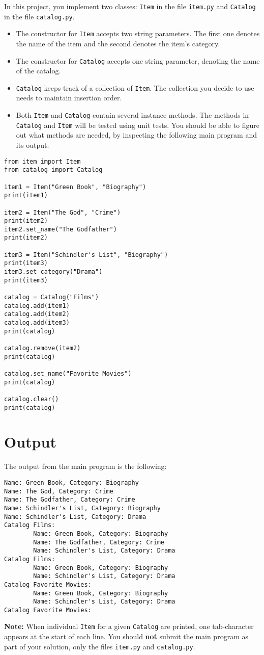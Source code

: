 
In this project, you implement two classes: 
\texttt{Item} in the file \texttt{item.py} and \texttt{Catalog} in the file \texttt{catalog.py}.  
\begin{itemize}
    \item The constructor for \texttt{Item} accepts two string parameters. The first one denotes the name of the item and the second denotes the item's category.
    \item The constructor for \texttt{Catalog} accepts one string parameter, denoting the name of the catalog.
    \item \texttt{Catalog} keeps track of a collection of \texttt{Item}. The collection you decide to use needs to maintain insertion order.
    \item Both \texttt{Item} and \texttt{Catalog} contain several instance methods. 
    The methods in \texttt{Catalog} and \texttt{Item} will be tested using unit tests. 
    You should be able to figure out what methods are needed, by inspecting the following main program and its output:
\end{itemize}

\begin{verbatim}
from item import Item
from catalog import Catalog

item1 = Item("Green Book", "Biography")
print(item1)

item2 = Item("The God", "Crime")
print(item2)
item2.set_name("The Godfather")
print(item2)

item3 = Item("Schindler's List", "Biography")
print(item3)
item3.set_category("Drama")
print(item3)

catalog = Catalog("Films")
catalog.add(item1)
catalog.add(item2)
catalog.add(item3)
print(catalog)

catalog.remove(item2)
print(catalog)

catalog.set_name("Favorite Movies")
print(catalog)

catalog.clear()
print(catalog)
\end{verbatim}

\section*{Output}
The output from the main program is the following: 
\begin{verbatim}
Name: Green Book, Category: Biography
Name: The God, Category: Crime
Name: The Godfather, Category: Crime
Name: Schindler's List, Category: Biography
Name: Schindler's List, Category: Drama
Catalog Films:
        Name: Green Book, Category: Biography
        Name: The Godfather, Category: Crime
        Name: Schindler's List, Category: Drama
Catalog Films:
        Name: Green Book, Category: Biography
        Name: Schindler's List, Category: Drama
Catalog Favorite Movies:
        Name: Green Book, Category: Biography
        Name: Schindler's List, Category: Drama
Catalog Favorite Movies:
\end{verbatim}

\textbf{Note:} When individual \texttt{Item} for a given \texttt{Catalog} are printed, one tab-character appears at the start of each line.
You should \textbf{not} submit the main program as part of your solution, only the files \texttt{item.py} and \texttt{catalog.py}.